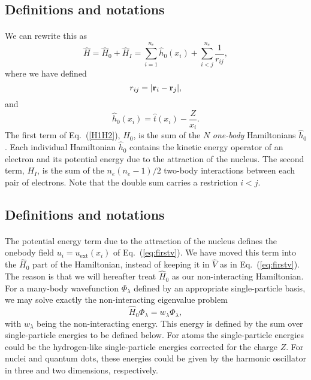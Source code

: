 \documentclass[%
twoside,                 %
final,                   %
10pt]{article}
\begin{document}
\subsection{Definitions and notations}

\paragraph{}
We can rewrite this as
\begin{equation}
    \hat{H} = \hat{H}_0 + \hat{H}_I 
    = \sum_{i=1}^{n_e}\hat{h}_0(x_i) + \sum_{i < j}^{n_e}\frac{1}{r_{ij}},
\label{H1H2}
\end{equation}
where  we have defined 
\[
r_{ij}=| {\bf r}_i-{\bf r}_j|,
\]
 and
\begin{equation}
  \hat{h}_0(x_i) =  \hat{t}(x_i) - \frac{Z}{x_i}.
\label{hi}
\end{equation}
The first term of Eq.~(\ref{H1H2}), $H_0$, is the sum of the $N$
\emph{one-body} Hamiltonians $\hat{h}_0$. Each individual
Hamiltonian $\hat{h}_0$ contains the kinetic energy operator of an
electron and its potential energy due to the attraction of the
nucleus. The second term, $H_I$, is the sum of the $n_e(n_e-1)/2$
two-body interactions between each pair of electrons. Note that the double sum carries a restriction $i < j$.




\subsection{Definitions and notations}

\paragraph{}
The potential energy term due to the attraction of the nucleus defines the onebody field $u_i=u_{\mathrm{ext}}(x_i)$ of Eq.~(\ref{eq:firstv}).
We have moved this term into the $\hat{H}_0$ part of the Hamiltonian, instead of keeping  it in $\hat{V}$ as in  Eq.~(\ref{eq:firstv}).
The reason is that we will hereafter treat $\hat{H}_0$ as our non-interacting  Hamiltonian. For a many-body wavefunction $\Phi_{\lambda}$ defined by an  
appropriate single-particle basis, we may solve exactly the non-interacting eigenvalue problem 
\[
\hat{H}_0\Phi_{\lambda}= w_{\lambda}\Phi_{\lambda},
\]
with $w_{\lambda}$ being the non-interacting energy. This energy is defined by the sum over single-particle energies to be defined below.
For atoms the single-particle energies could be the hydrogen-like single-particle energies corrected for the charge $Z$. For nuclei and quantum
dots, these energies could be given by the harmonic oscillator in three and two dimensions, respectively.
\end{document}

